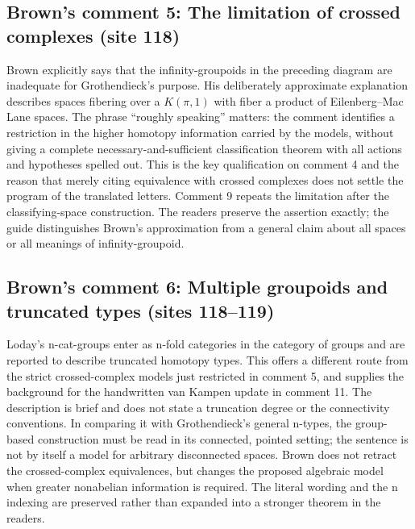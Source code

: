 \subsection*{Brown's comment 5: The limitation of crossed complexes (site 118)}
Brown explicitly says that the infinity-groupoids in the preceding diagram are inadequate for Grothendieck's purpose. His deliberately approximate explanation describes spaces fibering over a $K(\pi,1)$ with fiber a product of Eilenberg--Mac Lane spaces. The phrase ``roughly speaking'' matters: the comment identifies a restriction in the higher homotopy information carried by the models, without giving a complete necessary-and-sufficient classification theorem with all actions and hypotheses spelled out. This is the key qualification on comment 4 and the reason that merely citing equivalence with crossed complexes does not settle the program of the translated letters. Comment 9 repeats the limitation after the classifying-space construction. The readers preserve the assertion exactly; the guide distinguishes Brown's approximation from a general claim about all spaces or all meanings of infinity-groupoid.

\subsection*{Brown's comment 6: Multiple groupoids and truncated types (sites 118--119)}
Loday's n-cat-groups enter as n-fold categories in the category of groups and are reported to describe truncated homotopy types. This offers a different route from the strict crossed-complex models just restricted in comment 5, and supplies the background for the handwritten van Kampen update in comment 11. The description is brief and does not state a truncation degree or the connectivity conventions. In comparing it with Grothendieck's general n-types, the group-based construction must be read in its connected, pointed setting; the sentence is not by itself a model for arbitrary disconnected spaces. Brown does not retract the crossed-complex equivalences, but changes the proposed algebraic model when greater nonabelian information is required. The literal wording and the n indexing are preserved rather than expanded into a stronger theorem in the readers.

